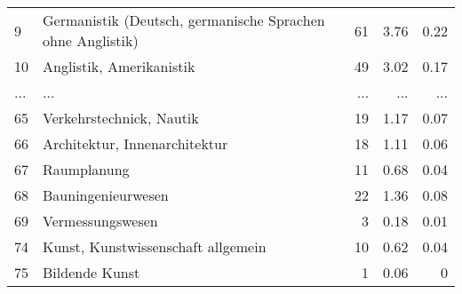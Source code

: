 \begin{longtable}{lXrrr}
        9 & \multicolumn{1}{X}{Germanistik (Deutsch, germanische Sprachen ohne Anglistik)} & %
          \num{61} &
          \num[round-mode=places,round-precision=2]{3,76} &
          \num[round-mode=places,round-precision=2]{0,22} \\
        10 & \multicolumn{1}{X}{Anglistik, Amerikanistik} & %
          \num{49} &
          \num[round-mode=places,round-precision=2]{3,02} &
          \num[round-mode=places,round-precision=2]{0,17} \\
       ... & ... & ... & ... & ... \\
        65 & \multicolumn{1}{X}{Verkehrstechnick, Nautik} & %
          \num{19} &
          \num[round-mode=places,round-precision=2]{1,17} &
          \num[round-mode=places,round-precision=2]{0,07} \\

        66 & \multicolumn{1}{X}{Architektur, Innenarchitektur} & %
          \num{18} &
          \num[round-mode=places,round-precision=2]{1,11} &
          \num[round-mode=places,round-precision=2]{0,06} \\

        67 & \multicolumn{1}{X}{Raumplanung} & %
          \num{11} &
          \num[round-mode=places,round-precision=2]{0,68} &
          \num[round-mode=places,round-precision=2]{0,04} \\

        68 & \multicolumn{1}{X}{Bauningenieurwesen} & %
          \num{22} &
          \num[round-mode=places,round-precision=2]{1,36} &
          \num[round-mode=places,round-precision=2]{0,08} \\

        69 & \multicolumn{1}{X}{Vermessungswesen} & %
          \num{3} &
          \num[round-mode=places,round-precision=2]{0,18} &
          \num[round-mode=places,round-precision=2]{0,01} \\

        74 & \multicolumn{1}{X}{Kunst, Kunstwissenschaft allgemein} & %
          \num{10} &
          \num[round-mode=places,round-precision=2]{0,62} &
          \num[round-mode=places,round-precision=2]{0,04} \\

        75 & \multicolumn{1}{X}{Bildende Kunst} & %
          \num{1} &
          \num[round-mode=places,round-precision=2]{0,06} &
          \num[round-mode=places,round-precision=2]{0} \\


\end{longtable}
